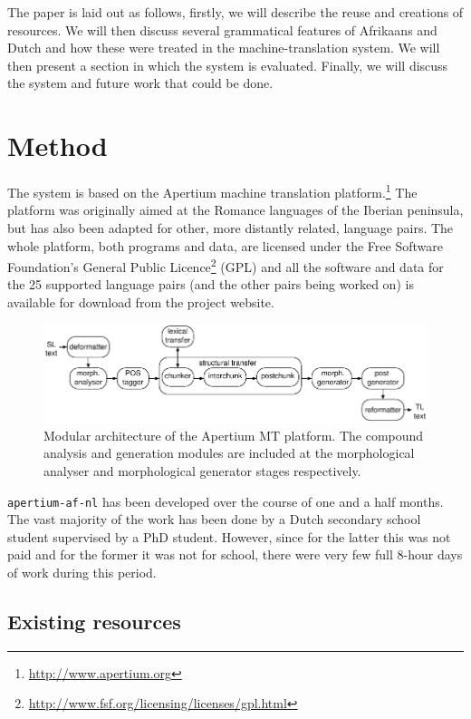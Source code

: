 \documentclass[11pt]{article}
\begin{document}
The paper is laid out as follows, firstly, we will describe the reuse and creations of 
resources. We will then discuss several grammatical features of Afrikaans and Dutch and how 
these were treated in the machine-translation system. We will then present a section 
in which the system is evaluated. Finally, we will discuss the system and future work that 
could be done.

\section{Method}

The system is based on the Apertium machine translation platform.\footnote{\url{http://www.apertium.org}} The
platform was originally aimed at the Romance languages of the Iberian
peninsula, but has also been adapted for other, more distantly related,
language pairs. The whole platform, both programs and data, are licensed
under the Free Software Foundation's General Public
Licence\footnote{\url{http://www.fsf.org/licensing/licenses/gpl.html}} (GPL)
and all the software and data for the 25 supported language pairs (and the
other pairs being worked on) is available for download from the project
website.

\begin{figure}
  \centering
  \includegraphics[scale=0.8]{apertium2.pdf}
  \caption{Modular architecture of the Apertium MT
    platform. The compound analysis and generation modules are included at the morphological
    analyser and morphological generator stages respectively.}
\label{fg:apertium}
\end{figure}

{\small {\tt apertium-af-nl}} has been developed over the course of one and a half months.
The vast majority of the work has been done by a Dutch secondary school student supervised 
by a PhD student. However, since for the latter this was not paid and for the former it was not for school, there were 
very few full 8-hour days of work during this period.

\subsection{Existing resources}
\end{document}
